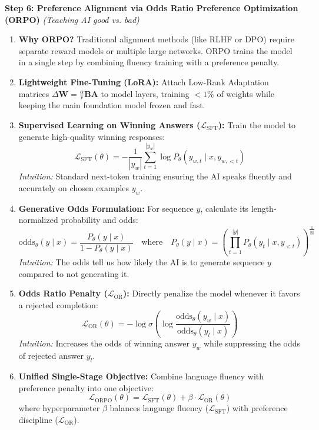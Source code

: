 \documentclass[11pt,a4paper]{article}
\begin{document}
\vspace{0.5em}
\textbf{Step 6: Preference Alignment via Odds Ratio Preference Optimization (ORPO)} \emph{(Teaching AI good vs. bad)}
\begin{enumerate}[leftmargin=1.5em, itemsep=0.24em, topsep=0.08em]
    \item \textbf{Why ORPO?} Traditional alignment methods (like RLHF or DPO) require separate reward models or multiple large networks. ORPO trains the model in a single step by combining fluency training with a preference penalty.
    \item \textbf{Lightweight Fine-Tuning (LoRA):} Attach Low-Rank Adaptation matrices $\Delta \mathbf{W} = \frac{\alpha}{r} \mathbf{B}\mathbf{A}$ to model layers, training $<1\%$ of weights while keeping the main foundation model frozen and fast.
    \item \textbf{Supervised Learning on Winning Answers ($\mathcal{L}_{\mathrm{SFT}}$):} Train the model to generate high-quality winning responses:
    \[
    \mathcal{L}_{\mathrm{SFT}}(\theta) = -\frac{1}{|y_w|} \sum_{t=1}^{|y_w|} \log P_\theta(y_{w,t} \mid x, y_{w,<t})
    \]
    \emph{Intuition:} Standard next-token training ensuring the AI speaks fluently and accurately on chosen examples $y_w$.
    \item \textbf{Generative Odds Formulation:} For sequence $y$, calculate its length-normalized probability and odds:
    \[
    \mathrm{odds}_\theta(y \mid x) = \frac{P_\theta(y \mid x)}{1 - P_\theta(y \mid x)} \quad \text{where} \quad P_\theta(y \mid x) = \left(\prod_{t=1}^{|y|} P_\theta(y_t \mid x, y_{<t})\right)^{\frac{1}{|y|}}
    \]
    \emph{Intuition:} The odds tell us how likely the AI is to generate sequence $y$ compared to not generating it.
    \item \textbf{Odds Ratio Penalty ($\mathcal{L}_{\mathrm{OR}}$):} Directly penalize the model whenever it favors a rejected completion:
    \[
    \mathcal{L}_{\mathrm{OR}}(\theta) = -\log \sigma \left( \log \frac{\mathrm{odds}_\theta(y_w \mid x)}{\mathrm{odds}_\theta(y_l \mid x)} \right)
    \]
    \emph{Intuition:} Increases the odds of winning answer $y_w$ while suppressing the odds of rejected answer $y_l$.
    \item \textbf{Unified Single-Stage Objective:} Combine language fluency with preference penalty into one objective:
    \[
    \mathcal{L}_{\mathrm{ORPO}}(\theta) = \mathcal{L}_{\mathrm{SFT}}(\theta) + \beta \cdot \mathcal{L}_{\mathrm{OR}}(\theta)
    \]
    where hyperparameter $\beta$ balances language fluency ($\mathcal{L}_{\mathrm{SFT}}$) with preference discipline ($\mathcal{L}_{\mathrm{OR}}$).
\end{enumerate}
\end{document}
